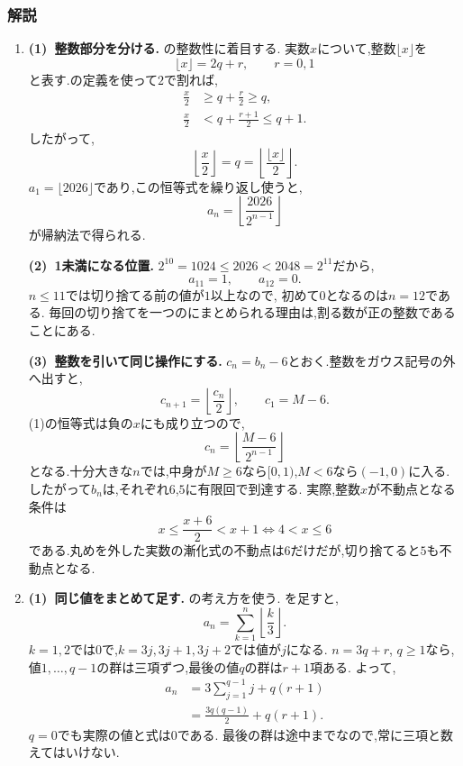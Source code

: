 \subsubsection{解説}\label{節：発展・特殊型：解説}
\begin{enumerate}[label=\textbf{問\arabic*.},leftmargin=3.8em,format=\bookitemlink{practice-special}{solution}{problem}]
  \item \textbf{(1)~整数部分を分ける.}
    の整数性に着目する.
    実数$x$について,整数$\lfloor x\rfloor$を
    \[
      \lfloor x\rfloor=2q+r,\qquad r=0,1
    \]
    と表す.の定義を使って$2$で割れば,
    \begin{align*}
      \frac x2&\ge q+\frac r2\ge q,\\
      \frac x2&<q+\frac{r+1}{2}\le q+1.
    \end{align*}
    したがって,
    \[
      \left\lfloor\frac{x}{2}\right\rfloor=q
      =\left\lfloor\frac{\lfloor x\rfloor}{2}\right\rfloor.
    \]
    $a_1=\lfloor2026\rfloor$であり,この恒等式を繰り返し使うと,
    \[
      a_n=\left\lfloor\frac{2026}{2^{n-1}}\right\rfloor
    \]
    が帰納法で得られる.

    \smallskip
    \textbf{(2)~1未満になる位置.}
    $2^{10}=1024\le2026<2048=2^{11}$だから,
    \[
      a_{11}=1,\qquad a_{12}=0.
    \]
    $n\le11$では切り捨てる前の値が$1$以上なので,
    初めて$0$となるのは$n=12$である.
    毎回の切り捨てを一つのにまとめられる理由は,割る数が正の整数であることにある.

    \smallskip
    \textbf{(3)~整数を引いて同じ操作にする.}
    $c_n=b_n-6$とおく.整数をガウス記号の外へ出すと,
    \[
      c_{n+1}=\left\lfloor\frac{c_n}{2}\right\rfloor,
      \qquad c_1=M-6.
    \]
    (1)の恒等式は負の$x$にも成り立つので,
    \[
      c_n=\left\lfloor\frac{M-6}{2^{n-1}}\right\rfloor
    \]
    となる.十分大きな$n$では,中身が$M\ge6$なら$[0,1)$,$M<6$なら$(-1,0)$に入る.
    したがって$b_n$は,それぞれ$6$,$5$に有限回で到達する.
    実際,整数$x$が不動点となる条件は
    \[
      x\le\frac{x+6}{2}<x+1
      \iff 4<x\le6
    \]
    である.丸めを外した実数の漸化式の不動点は$6$だけだが,切り捨てると$5$も不動点となる.
  \item \textbf{(1)~同じ値をまとめて足す.}
    の考え方を使う.
    を足すと,
    \[
      a_n=\sum_{k=1}^{n}\left\lfloor\frac{k}{3}\right\rfloor.
    \]
    $k=1,2$では0で,$k=3j,3j+1,3j+2$では値が$j$になる.
    $n=3q+r$, $q\ge1$なら,値$1,\ldots,q-1$の群は三項ずつ,最後の値$q$の群は$r+1$項ある.
    よって,
    \begin{align*}
      a_n&=3\sum_{j=1}^{q-1}j+q(r+1)\\
      &=\frac{3q(q-1)}2+q(r+1).
    \end{align*}
    $q=0$でも実際の値と式は0である.
    最後の群は途中までなので,常に三項と数えてはいけない.


\end{enumerate}
